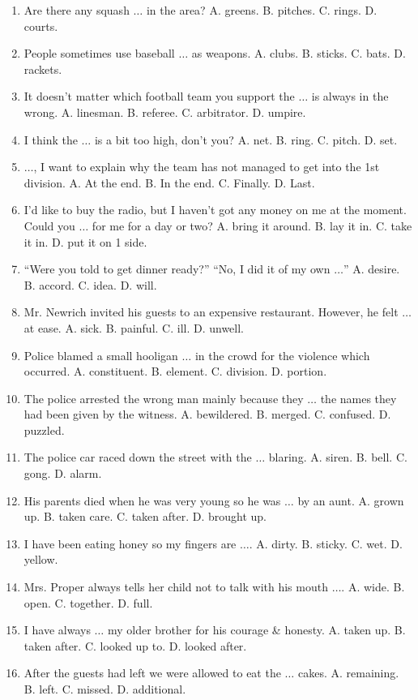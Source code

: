 \documentclass{article}
\numberwithin{equation}{section}
\begin{document}
\begin{enumerate}[leftmargin=5mm]
	\item Are there any squash $\ldots$ in the area? A. greens. B. pitches. C. rings. D. courts.
	\item People sometimes use baseball $\ldots$ as weapons. A. clubs. B. sticks. C. bats. D. rackets.
	\item It doesn't matter which football team you support the $\ldots$ is always in the wrong. A. linesman. B. referee. C. arbitrator. D. umpire.
	\item I think the $\ldots$ is a bit too high, don't you? A. net. B. ring. C. pitch. D. set.
	\item $\ldots$, I want to explain why the team has not managed to get into the 1st division. A. At the end. B. In the end. C. Finally. D. Last.
	\item I'd like to buy the radio, but I haven't got any money on me at the moment. Could you $\ldots$ for me for a day or two? A. bring it around. B. lay it in. C. take it in. D. put it on 1 side.
	\item ``Were you told to get dinner ready?'' ``No, I did it of my own $\ldots$'' A. desire. B. accord. C. idea. D. will.
	\item Mr. Newrich invited his guests to an expensive restaurant. However, he felt $\ldots$ at ease. A. sick. B. painful. C. ill. D. unwell.
	\item Police blamed a small hooligan $\ldots$ in the crowd for the violence which occurred. A. constituent. B. element. C. division. D. portion.
	\item The police arrested the wrong man mainly because they $\ldots$ the names they had been given by the witness. A. bewildered. B. merged. C. confused. D. puzzled.
	\item The police car raced down the street with the $\ldots$ blaring. A. siren. B. bell. C. gong. D. alarm.
	\item His parents died when he was very young so he was $\ldots$ by an aunt. A. grown up. B. taken care. C. taken after. D. brought up.
	\item I have been eating honey so my fingers are $\ldots$. A. dirty. B. sticky. C. wet. D. yellow.
	\item Mrs. Proper always tells her child not to talk with his mouth $\ldots$. A. wide. B. open. C. together. D. full.
	\item I have always $\ldots$ my older brother for his courage \& honesty. A. taken up. B. taken after. C. looked up to. D. looked after.
	\item After the guests had left we were allowed to eat the $\ldots$ cakes. A. remaining. B. left. C. missed. D. additional.

\end{enumerate}
\end{document}
